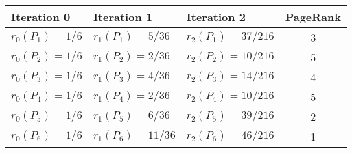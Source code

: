 \begin{table}[h]
	\centering
	\begin{tabular}{l l l c}
		\toprule
	\textbf{Iteration 0} & \textbf{Iteration 1} & \textbf{Iteration 2} & \textbf{PageRank}\\
		\midrule
		$r_{0}\left(P_{1}\right)=1 / 6$ & $r_{1}\left(P_{1}\right)=5 / 36$ & $r_{2}\left(P_{1}\right)=37 / 216$ & 3 \\
		$r_{0}\left(P_{2}\right)=1 / 6$ & $r_{1}\left(P_{2}\right)=2 / 36$ & $r_{2}\left(P_{2}\right)=10 / 216$ & 5 \\
		$r_{0}\left(P_{3}\right)=1 / 6$ & $r_{1}\left(P_{3}\right)=4 / 36$ & $r_{2}\left(P_{3}\right)=14 / 216$ & 4 \\
		$r_{0}\left(P_{4}\right)=1 / 6$ & $r_{1}\left(P_{4}\right)=2 / 36$ & $r_{2}\left(P_{4}\right)=10 / 216$ & 5 \\
		$r_{0}\left(P_{5}\right)=1 / 6$ & $r_{1}\left(P_{5}\right)=6 / 36$ & $r_{2}\left(P_{5}\right)=39 / 216$ & 2 \\
		$r_{0}\left(P_{6}\right)=1 / 6$ & $r_{1}\left(P_{6}\right)=11 / 36$ & $r_{2}\left(P_{6}\right)=46 / 216$ & 1\\			\bottomrule
		\end{tabular}
\end{table}